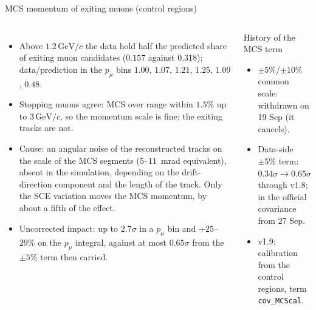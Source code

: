 \documentclass[aspectratio=169,10pt]{beamer}
\newcommand{\GeVc}{\ensuremath{\,\mathrm{GeV}/c}}
\begin{document}
\begin{frame}{MCS momentum of exiting muons (control regions)}
  \begin{columns}[T]
  \begin{itemize}\footnotesize\setlength\itemsep{3pt}
    \item Above $1.2\GeVc$ the data hold half the predicted share of exiting muon candidates ($0.157$ against
          $0.318$); data/prediction in the $p_\mu$ bins $1.00$, $1.07$, $1.21$, $1.25$, $1.09$, $0.48$.
    \item Stopping muons agree: MCS over range within $1.5\%$ up to $3\GeVc$, so the momentum scale is fine; the
          exiting tracks are not.
    \item Cause: an angular noise of the reconstructed tracks on the scale of the MCS segments ($5$--$11$~mrad
          equivalent), absent in the simulation, depending on the drift-direction component and the length of the
          track. Only the SCE variation moves the MCS momentum, by about a fifth of the effect.
    \item Uncorrected impact: up to $2.7\sigma$ in a $p_\mu$ bin and $+25$--$29\%$ on the $p_\mu$ integral, against at
          most $0.65\sigma$ from the $\pm5\%$ term then carried.
  \end{itemize}
  \begin{block}{\small History of the MCS term}\footnotesize
    \begin{itemize}\setlength\itemsep{1pt}
      \item $\pm5\%$/$\pm10\%$ common scale: withdrawn on 19 Sep (it cancels).
      \item Data-side $\pm5\%$ term: $0.34\sigma\to0.65\sigma$ through v1.8; in the official covariance from 27 Sep.
      \item v1.9: calibration from the control regions, term \texttt{cov\_MCScal}.
    \end{itemize}
  \end{block}
  \end{columns}
\end{frame}
\end{document}

